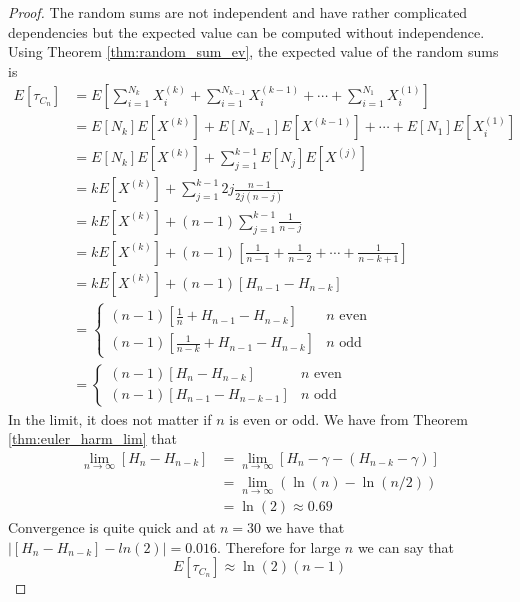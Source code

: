 \begin{proof}
The random sums are not independent and have rather complicated dependencies but the expected value can be computed without independence.
Using Theorem \ref{thm:random_sum_ev}, the expected value of the random sums is
\begin{align*}
    E[\tau_{C_n}] &= E\left[\sum_{i = 1}^{N_k} X_i^{(k)} + \sum_{i = 1}^{N_{k - 1}} X_i^{(k - 1)} + \cdots + \sum_{i = 1}^{N_1} X_i^{(1)}\right]\\
    &= E[N_k] E[X^{(k)}] + E[N_{k - 1}] E[X^{(k - 1)}] + \cdots + E[N_1]E[X_i^{(1)}]\\
    &= E[N_k] E[X^{(k)}] + \sum_{j = 1}^{k - 1} E[N_j]E[X^{(j)}]\\
    &= k E[X^{(k)}] + \sum_{j = 1}^{k - 1} 2j \frac{n - 1}{2j (n - j)} \\
    &= k E[X^{(k)}] + (n - 1) \sum_{j = 1}^{k - 1} \frac{1}{n - j}\\
    &= k E[X^{(k)}] + (n - 1) \left[ \frac{1}{n - 1} + \frac{1}{n - 2} + \cdots + \frac{1}{n - k + 1} \right]\\
    &= k E[X^{(k)}] + (n - 1) \left[ H_{n - 1} - H_{n - k} \right]\\
    &= \begin{cases}
    (n - 1) \left[\frac{1}{n} + H_{n - 1} - H_{n - k}\right] & n \text{ even}\\
    (n - 1) \left[\frac{1}{n - k} + H_{n - 1} - H_{n - k}\right] & n \text{ odd}
    \end{cases}\\
    &= \begin{cases}
    (n - 1) \left[H_{n} - H_{n - k}\right] & n \text{ even}\\
    (n - 1) \left[H_{n - 1} - H_{n - k - 1}\right] & n \text{ odd}
\end{cases}
\end{align*}
In the limit, it does not matter if $n$ is even or odd.
We have from Theorem \ref{thm:euler_harm_lim} that
\begin{align*}
    \lim_{n \to \infty} [H_{n} - H_{n - k}] &=  \lim_{n \to \infty} [H_{n} - \gamma - (H_{n - k} - \gamma)]\\
    &= \lim_{n \to \infty} (\ln(n) - \ln(n/2))\\
    &= \ln(2) \approx 0.69
\end{align*}
Convergence is quite quick and at $n = 30$ we have that $|[H_{n} - H_{n - k}] - ln(2)| = 0.016$.
Therefore for large $n$ we can say that
$$
E[\tau_{C_n}] \approx \ln(2) (n - 1)
$$
\end{proof}

